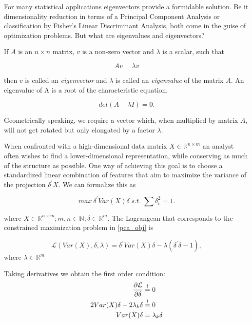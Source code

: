 \documentclass[12pt]{article}
\begin{document}
For many statistical applications eigenvectors provide a formidable solution. Be it dimensionality reduction in terms of a Principal Component Analysis or classification by Fisher's Linear Discriminant Analysis, both come in the guise of optimization problems. But what are eigenvalues and eigenvectors? 

If $A$ is an $n \times n$ matrix, $v$ is a non-zero vector and $\lambda$ is a scalar, such that

\begin{equation}
\label{eigenvalue-def}
Av = \lambda v
\end{equation}

then $v$ is called an \textit{eigenvector} and $\lambda$ is called an \textit{eigenvalue} of the matrix $A$.
An eigenvalue of A is a root of the characteristic equation,

\begin{equation}
\label{eigenvalue-solve}
det\left(A - \lambda I \right) = 0.
\end{equation}

Geometrically speaking, we require a vector which, when multiplied by matrix $A$, will not get rotated but only elongated by a factor $\lambda$.

When confronted with a high-dimensional data matrix $X \in \mathbb{R}^{n \times m}$ an analyst often wishes to find a lower-dimensional representation, while conserving as much of the structure as possible. One way of achieving this goal is to choose a standardized linear combination of features that aim to maximize the variance of the projection $\delta^{\prime} X$. We can formalize this as

\begin{equation}
	\label{pca_obj}
    	max\ \delta^{\prime} Var \left(X\right) \delta \; s.t. \; \sum \delta_i^2 = 1.
\end{equation}

where $X \in \mathbb{R}^{n \times m}; m,n \in \mathbb{N}; \delta \in \mathbb{R}^m$. The Lagrangean that corresponds to the constrained maximization problem in \ref{pca_obj} is

$$
    \mathcal{L}(Var \left(X\right), \delta, \lambda) =
    \delta^{\prime} Var \left(X\right) \delta - \lambda \left(\delta^{\prime}\delta - 1\right),
$$
where $\lambda \in \mathbb{R}^m$

Taking derivatives we obtain the first order condition:
	\begin{align}
	\frac{\partial \mathcal{L}}{\partial \delta} &\stackrel{!}{=} 0 \notag\\
	2Var(X)\delta - 2\lambda_k \delta &\stackrel{!}{=} 0 \notag\\
	Var(X)\delta  &= \lambda_k \delta \notag
	\end{align}
\end{document}
